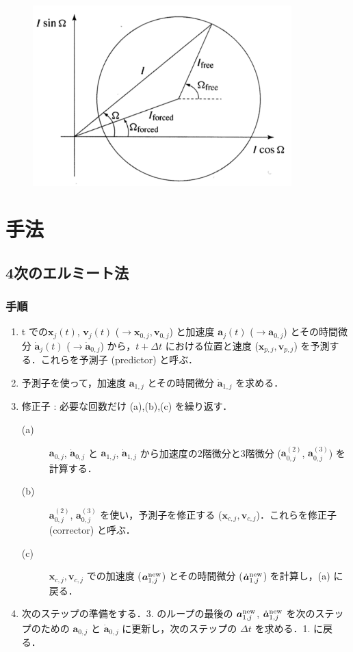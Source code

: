 \documentclass[11pt,a4paper,oneside,onecolumn]{jarticle}
\begin{document}
\begin{figure}[H]
\centering
\includegraphics[width=10cm]{./image/sec7_3.pdf}
\caption{\label{}}
\end{figure}

\section{手法}
\subsection{4次のエルミート法 \label{sec:Hermite}}
\subsubsection{手順}
\begin{enumerate}
\item t での${\bm x}_j (t)$, ${\bm v}_j (t)$ ($\to {\bm x}_{0,j} , {\bm v}_{0,j}$) と加速度 ${\bm a}_j (t)$ ($\to {\bm a}_{0,j}$) とその時間微分 $\dot{{\bm a}}_j (t)$ ($\to \dot{{\bm a}}_{0,j}$) から，$t + \Delta t$ における位置と速度 (${\bm x}_{p,j} , {\bm v}_{p,j}$) を予測する．これらを予測子 (predictor) と呼ぶ．
\item 予測子を使って，加速度 ${\bm a}_{1,j}$ とその時間微分 $\dot{{\bm a}}_{1,j}$ を求める．
\item 修正子 : 必要な回数だけ (a),(b),(c) を繰り返す．
\begin{description}
\item[(a)] ${\bm a}_{0,j}$, $\dot{{\bm a}}_{0,j}$ と ${\bm a}_{1,j}$, $\dot{{\bm a}}_{1,j}$ から加速度の2階微分と3階微分 (${\bm a}_{0,j}^{(2)}$, ${\bm a}_{0,j}^{(3)}$) を計算する．
\item[(b)] ${\bm a}_{0,j}^{(2)}$, ${\bm a}_{0,j}^{(3)}$ を使い，予測子を修正する (${\bm x}_{c,j} , {\bm v}_{c,j}$)．これらを修正子 (corrector) と呼ぶ．
\item[(c)] ${\bm x}_{c,j} , {\bm v}_{c,j}$ での加速度 (${\bm a}_{1,j}^{{\rm new}}$) とその時間微分 ($\dot{{\bm a}}_{1,j}^{{\rm new}}$) を計算し，(a) に戻る．
\end{description}
\item 次のステップの準備をする．3. のループの最後の ${\bm a}_{1,j}^{{\rm new}}$, $\dot{{\bm a}}_{1,j}^{{\rm new}}$ を次のステップのための ${\bm a}_{0,j}$ と $\dot{{\bm a}}_{0,j}$ に更新し，次のステップの $\Delta t$ を求める．1. に戻る．
\end{enumerate}
\end{document}
